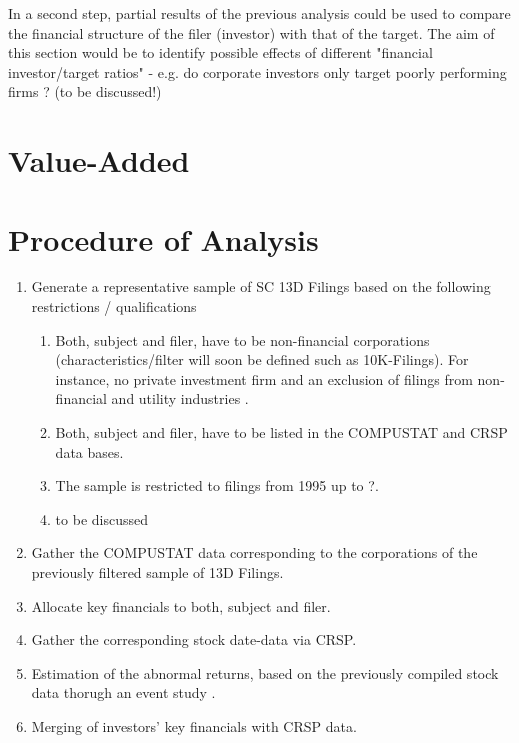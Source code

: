 \documentclass[12pt]{article}
\begin{document}
In a second step, partial results of the previous analysis could be used to compare the financial structure of the filer (investor) with that of the target. The aim of this section would be to identify possible effects of different "financial investor/target ratios" - e.g. do corporate investors only target poorly performing firms \citep{Klein2009}? (to be discussed!)

\section{Value-Added}

\section{Procedure of Analysis}

\begin{enumerate}
\item Generate a representative sample of SC 13D Filings based on the following restrictions / qualifications
	
	\begin{enumerate}
	\item Both, subject and filer, have to be non-financial corporations (characteristics/filter will soon be defined such as 10K-Filings). For instance, no private investment firm and an exclusion of filings from non-financial and utility industries \citep{Brigida2012}.
 	\item Both, subject and filer, have to be listed in the COMPUSTAT and CRSP data bases.
	\item The sample is restricted to filings from 1995 up to ?.
	\item to be discussed
	\end{enumerate}
	
\item Gather the COMPUSTAT data corresponding to the corporations of the previously filtered sample of 13D Filings.
\item Allocate key financials to both, subject and filer.
\item Gather the corresponding stock date-data via CRSP.
\item Estimation of the abnormal returns, based on the previously compiled stock data thorugh an event study \citep{ang2011} \citep{Fama1992} \citep{Kolari2010}. 
\item Merging of investors' key financials with CRSP data.

\end{enumerate}

\pagebreak
\printbibliography[title=Relevant Literature]
\end{document}
